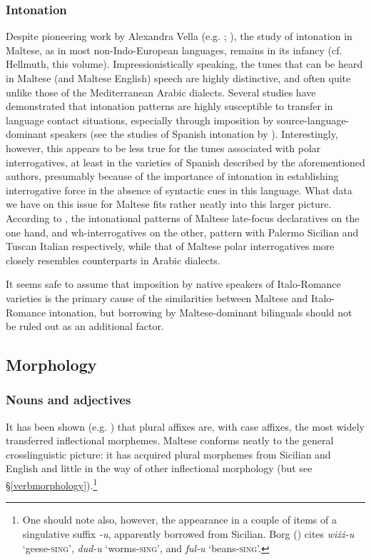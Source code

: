 \documentclass[output=paper]{langsci/langscibook}
\begin{document}
\subsubsection{Intonation}
Despite pioneering work by Alexandra Vella (e.g. \citealt{Vella1994,vella2003,Vella2009}; \citealt{GriceVellaBruggeman2019}), the study of intonation in Maltese, as in most non-Indo-European languages, remains in its infancy (cf. Hellmuth, this volume). Impressionistically speaking, the tunes that can be heard in Maltese (and Maltese English) speech are highly distinctive, and often quite unlike those of the Mediterranean Arabic dialects. Several studies have demonstrated that intonation patterns are highly susceptible to transfer in language contact situations, especially through imposition by source-language-dominant speakers (see the studies of Spanish intonation by \citealt{orourke2005,gabrielkireva2014}). Interestingly, however, this appears to be less true for the tunes associated with polar interrogatives, at least in the varieties of Spanish described by the aforementioned authors, presumably because of the importance of intonation in establishing interrogative force in the absence of syntactic cues in this language. What data we have on this issue for Maltese fits rather neatly into this larger picture. According to \cite{vella2003}, the intonational patterns of Maltese late-focus declaratives on the one hand, and wh-interrogatives on the other, pattern with Palermo Sicilian and Tuscan Italian respectively, while that of Maltese polar interrogatives more closely resembles counterparts in Arabic dialects.

It seems safe to assume that imposition by native speakers of Italo-Romance varieties is the primary cause of the similarities between Maltese and Italo-Romance intonation, but borrowing by Maltese-dominant bilinguals should not be ruled out as an additional factor.

\subsection{Morphology}
\subsubsection{Nouns and adjectives}
 \label{inflection}
It has been shown (e.g. \citealt{Gardani2012,Seifart2017}) that plural affixes are, with case affixes, the most widely transferred inflectional morphemes. Maltese conforms neatly to the general crosslinguistic picture: it has acquired plural morphemes from Sicilian and English and little in the way of other inflectional morphology (but see §\ref{verbmorphology}).\footnote{One should note also, however, the appearance in a couple of items of a singulative suffix \textit{-u}, apparently borrowed from Sicilian. Borg (\citeyear[57]{Borg1994}) cites \textit{wiżż-u} `geese-\textsc{sing}', \textit{dud-u} `worms-\textsc{sing}', and \textit{ful-u} `beans-\textsc{sing}'.}
\end{document}
